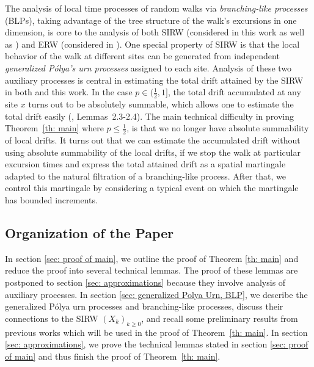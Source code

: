 \documentclass[EJP]{ejpecp} %
\begin{document}
The analysis of local time processes of random walks via \textit{branching-like processes} (BLPs), taking advantage of the tree structure of the walk's excursions in one dimension, is core to the analysis of both SIRW (considered in this work as well as \cite{T96, KMP23}) and ERW (considered in \cite{DK12, KP16, KMP22}). 
One special property of SIRW is that the local behavior of the walk at different sites can be generated from independent \textit{generalized P\'olya's urn processes} assigned to each site.
Analysis of these two auxiliary processes is central in estimating the total drift attained by the SIRW in both \cite{KMP23} and this work.
In the case $p \in (\frac{1}{2}, 1]$, the total drift accumulated at any site $x$ turns out to be absolutely summable, which allows one to estimate the total drift easily (\cite{KMP23}, Lemmas~2.3-2.4).
The main technical difficulty in proving Theorem~\ref{th: main} where $p \le \frac{1}{2}$, is that we no longer have absolute summability of local drifts.
It turns out that we can estimate the accumulated drift without using absolute summability of the local drifts, if we stop the walk at particular excursion times and express the total attained drift as a spatial martingale adapted to the natural filtration of a branching-like process. After that, we control this martingale by considering a typical event on which the martingale has bounded increments.


\subsection{Organization of the Paper}
In section \ref{sec: proof of main}, we outline the proof of Theorem \ref{th: main} and reduce the proof into several technical lemmas. The proof of these lemmas are postponed to section \ref{sec: approximations} because they involve analysis of auxiliary processes. In section \ref{sec: generalized Polya Urn, BLP}, we describe the generalized P\'{o}lya urn processes and branching-like processes, discuss their connections to the SIRW $(X_k)_{k\geq 0}$, and recall some preliminary results from previous works which will be used in the proof of Theorem~\ref{th: main}. In section \ref{sec: approximations}, we prove the technical lemmas stated in section \ref{sec: proof of main} and thus finish the proof of Theorem~\ref{th: main}. 
\end{document}
